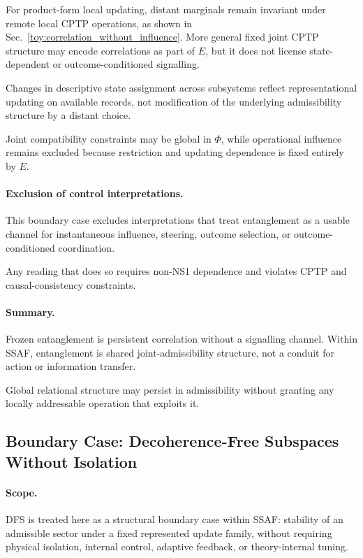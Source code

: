 \documentclass[aps,prx,onecolumn,11pt]{revtex4-2}
\theoremstyle{plain}
\theoremstyle{definition}
\theoremstyle{remark}
\begin{document}
For product-form local updating, distant marginals remain invariant
under remote local CPTP operations, as shown in
Sec.~\ref{toy:correlation_without_influence}. More general fixed
joint CPTP structure may encode correlations as part of \(E\), but it
does not license state-dependent or outcome-conditioned signalling.

Changes in descriptive state assignment across subsystems reflect
representational updating on available records, not modification of the
underlying admissibility structure by a distant choice.

Joint compatibility constraints may be global in \(\Phi\), while
operational influence remains excluded because restriction and updating
dependence is fixed entirely by \(E\).

\paragraph{Exclusion of control interpretations.}

This boundary case excludes interpretations that treat entanglement as
a usable channel for instantaneous influence, steering, outcome
selection, or outcome-conditioned coordination.

Any reading that does so requires non-NS1 dependence and violates CPTP
and causal-consistency constraints.

\paragraph{Summary.}

Frozen entanglement is persistent correlation without a signalling
channel. Within SSAF, entanglement is shared joint-admissibility
structure, not a conduit for action or information transfer.

Global relational structure may persist in admissibility without
granting any locally addressable operation that exploits it.

\subsection{Boundary Case: Decoherence-Free Subspaces Without Isolation}
\label{subsec:dfs_boundary}

\paragraph{Scope.}

DFS is treated here as a structural boundary case within SSAF:
stability of an admissible sector under a fixed represented update
family, without requiring physical isolation, internal control,
adaptive feedback, or theory-internal tuning.
\end{document}
